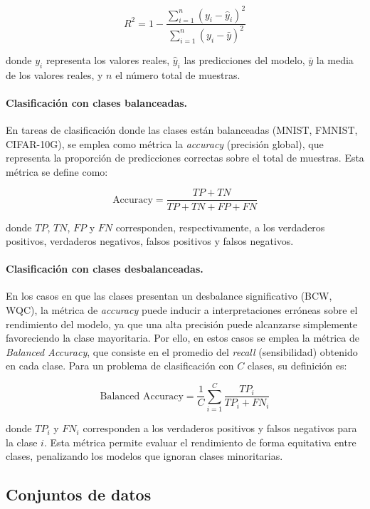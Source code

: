 \[
R^2 = 1 - \frac{\sum_{i=1}^{n} (y_i - \hat{y}_i)^2}{\sum_{i=1}^{n} (y_i - \bar{y})^2}
\]

donde \( y_i \) representa los valores reales, \( \hat{y}_i \) las predicciones del modelo, \( \bar{y} \) la media de los valores reales, y \( n \) el número total de muestras.

\paragraph{Clasificación con clases balanceadas.} En tareas de clasificación donde las clases están balanceadas (MNIST, FMNIST, CIFAR-10G), se emplea como métrica la \emph{accuracy} (precisión global), que representa la proporción de predicciones correctas sobre el total de muestras. Esta métrica se define como:

\[
\text{Accuracy} = \frac{TP + TN}{TP + TN + FP + FN}
\]

donde \( TP \), \( TN \), \( FP \) y \( FN \) corresponden, respectivamente, a los verdaderos positivos, verdaderos negativos, falsos positivos y falsos negativos.

\paragraph{Clasificación con clases desbalanceadas.} En los casos en que las clases presentan un desbalance significativo (BCW, WQC), la métrica de \emph{accuracy} puede inducir a interpretaciones erróneas sobre el rendimiento del modelo, ya que una alta precisión puede alcanzarse simplemente favoreciendo la clase mayoritaria. Por ello, en estos casos se emplea la métrica de \emph{Balanced Accuracy}, que consiste en el promedio del \emph{recall} (sensibilidad) obtenido en cada clase. Para un problema de clasificación con \( C \) clases, su definición es:

\[
\text{Balanced Accuracy} = \frac{1}{C} \sum_{i=1}^{C} \frac{TP_i}{TP_i + FN_i}
\]

donde \( TP_i \) y \( FN_i \) corresponden a los verdaderos positivos y falsos negativos para la clase \( i \). Esta métrica permite evaluar el rendimiento de forma equitativa entre clases, penalizando los modelos que ignoran clases minoritarias.




\subsection{Conjuntos de datos} \label{sec:conjuntos_de_datos}



